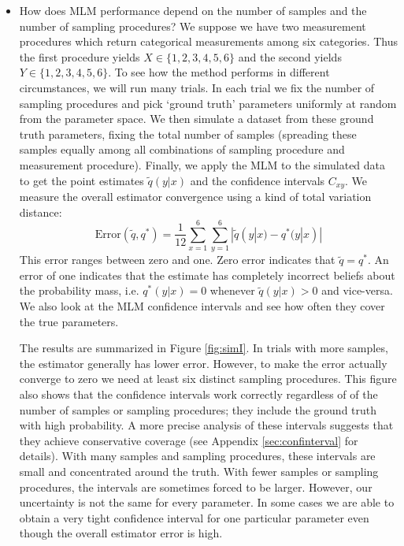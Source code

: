 \begin{itemize}
    \item How does MLM performance depend on the number of samples and the number of sampling procedures?  We suppose we have two measurement procedures which return categorical measurements among six categories.  Thus the first procedure yields $X\in \{1,2,3,4,5,6\}$ and the second yields $Y\in \{1,2,3,4,5,6\}$.  To see how the method performs in different circumstances, we will run many trials.  In each trial we fix the number of sampling procedures and pick `ground truth' parameters uniformly at random from the parameter space.  We then simulate a dataset from these ground truth parameters, fixing the total number of samples (spreading these samples equally among all combinations of sampling procedure and measurement procedure).  Finally, we apply the MLM to the simulated data to get the point estimates $\tilde q(y|x)$ and the confidence intervals $C_{x y}$.  We measure the overall estimator convergence using a kind of total variation distance:
    \[
    \mathrm{Error}(\tilde q,q^*)=\frac{1}{12}\sum_{x=1}^{6}\sum_{y=1}^{6} |\tilde q(y|x) - q^*(y|x)|
    \]
    This error ranges between zero and one.  Zero error indicates that $\tilde q=q^*$. An error of one indicates that the estimate has completely incorrect beliefs about the probability mass, i.e. $q^*(y|x)=0$ whenever $\tilde q(y|x)>0$ and vice-versa.  We also look at the MLM confidence intervals and see how often they cover the true parameters.  

    The results are summarized in Figure \ref{fig:simI}.  In trials with more samples, the estimator generally has lower error.  However, to make the error actually converge to zero we need at least six distinct sampling procedures.  This figure also shows that the confidence intervals work correctly regardless of of the number of samples or sampling procedures; they include the ground truth with high probability.  A more precise analysis of these intervals suggests that they achieve conservative coverage (see Appendix \ref{sec:confinterval} for details).  With many samples and sampling procedures, these intervals are small and concentrated around the truth.  With fewer samples or sampling procedures, the intervals are sometimes forced to be larger.  However, our uncertainty is not the same for every parameter.  In some cases we are able to obtain a very tight confidence interval for one particular parameter even though the overall estimator error is high.  


\end{itemize}
